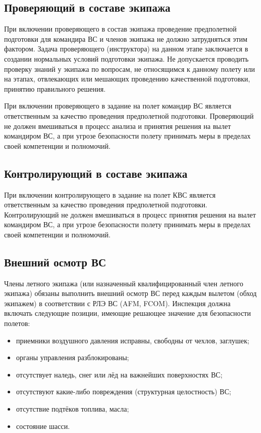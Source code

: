 \subsection{Проверяющий в составе экипажа}

При включении проверяющего в состав экипажа проведение предполетной подготовки для командира ВС и членов экипажа не должно затрудняться этим фактором. Задача проверяющего (инструктора) на данном этапе заключается в создании нормальных условий подготовки экипажа. Не допускается проводить проверку знаний у экипажа по вопросам, не относящимся к данному полету или на этапах, отвлекающих или мешающих проведению качественной подготовки, принятию правильного решения.

При включении проверяющего в задание на полет командир ВС является ответственным за качество проведения предполетной подготовки. Проверяющий не должен вмешиваться в процесс анализа и принятия решения на вылет командиром ВС, а при угрозе безопасности полету принимать меры в пределах своей компетенции и полномочий. 

\subsection{Контролирующий в составе экипажа}

При включении контролирующего в задание на полет КВС является ответственным за качество проведения предполетной подготовки. Контролирующий не должен вмешиваться в процесс принятия решения на вылет командиром ВС, а при угрозе безопасности полету принимать меры в пределах своей компетенции и полномочий.

\subsection{Внешний осмотр ВС}

Члены летного экипажа (или назначенный квалифицированный член летного экипажа) обязаны выполнить внешний осмотр ВС перед каждым вылетом (обход экипажем) в соответствии с РЛЭ ВС (AFM, FCOM). Инспекция должна включать следующие позиции, имеющие решающее значение для безопасности полетов:
\begin{itemize}
    \item приемники воздушного давления исправны, свободны от чехлов, заглушек; 
    \item органы управления разблокированы; 
    \item отсутствует наледь, снег или лёд на важнейших поверхностях ВС; 
    \item отсутствуют какие-либо повреждения (структурная целостность) ВС; 
    \item отсутствие подтёков топлива, масла;
    \item состояние шасси.
\end{itemize}

